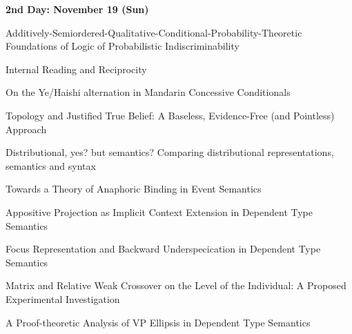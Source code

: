 \documentclass[12pt]{jarticle}
\begin{document}
\noindent\textbf{\large 
2nd Day: November 19 (Sun)
}\\







  
      {Additively-Semiordered-Qualitative-Conditional-Probability-Theoretic Foundations of Logic of Probabilistic Indiscriminability}
      {}
  
      {Internal Reading and Reciprocity}
      {}
  
      {On the Ye/Haishi alternation in Mandarin Concessive Conditionals}
      {}




  
      {Topology and Justified True Belief: A Baseless, Evidence-Free (and Pointless) Approach}
      {}
  
      {Distributional, yes? but semantics? Comparing distributional representations, semantics and syntax}
      {}
  
      {Towards a Theory of Anaphoric Binding in Event Semantics}
      {}







  
      {Appositive Projection as Implicit Context Extension in Dependent Type Semantics}
      {}
  
      {Focus Representation and Backward Underspecication in Dependent Type Semantics}
      {}
  
      {Matrix and Relative Weak Crossover on the Level of the Individual: A Proposed Experimental Investigation}
      {}







  
      {A Proof-theoretic Analysis of VP Ellipsis in Dependent Type Semantics}
      {}
  
\end{document}
